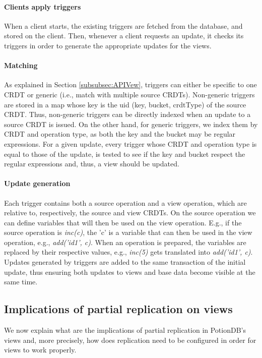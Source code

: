 \documentclass{vldb}
\begin{document}
\paragraph{Clients apply triggers} When a client starts, the existing triggers are fetched from the database, and stored on the client.
Then, whenever a client requests an update, it checks its triggers in order to generate the appropriate updates for the views.

\paragraph{Matching} As explained in Section \ref{subsubsec:APIVew}, triggers can either be specific to one CRDT or generic (i.e., match with multiple source CRDTs).
Non-generic triggers are stored in a map whose key is the uid (key, bucket, crdtType) of the source CRDT.
Thus, non-generic triggers can be directly indexed when an update to a source CRDT is issued.
On the other hand, for generic triggers, we index them by CRDT and operation type, as both the key and the bucket may be regular expressions.
For a given update, every trigger whose CRDT and operation type is equal to those of the update, is tested to see if the key and bucket respect the regular expressions and, thus, a view should be updated.

\paragraph{Update generation}
Each trigger contains both a source operation and a view operation, which are relative to, respectively, the source and view CRDTs.
On the source operation we can define variables that will then be used on the view operation. E.g., if the source operation is \emph{inc(c)}, the 'c' is a variable that can then be used in the view operation, e.g., \emph{add('id1', c)}.
When an operation is prepared, the variables are replaced by their respective values, e.g., \emph{inc(5)} gets translated into \emph{add('id1', c)}.
Updates generated by triggers are added to the same transaction of the initial update, thus ensuring both updates to views and base data become visible at the same time.

\subsection{Implications of partial replication  on views}

We now explain what are the implications of partial replication in PotionDB's views and, more precisely, how does replication need to be configured in order for views to work properly.
\end{document}
